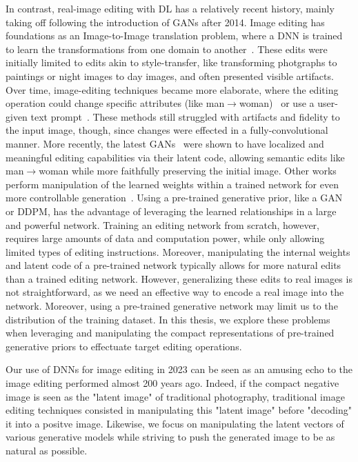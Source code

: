 In contrast, real-image editing with \ac{DL} has a relatively recent history, mainly taking off following the introduction of \ac{GAN}s after 2014.
Image editing has foundations as an Image-to-Image translation problem, where a \ac{DNN} is trained to learn the transformations from 
one domain to another~\citep{isola2017image}. These edits were initially limited to edits akin to style-transfer, like transforming 
photgraphs to paintings or night images to day images, and often presented visible artifacts.
Over time, image-editing techniques became more elaborate, where the editing operation could change  specific attributes 
(like man$\rightarrow$woman)~\citep{choi2020stargan} or use a user-given text prompt~\citep{li2020manigan}. These methods still struggled with artifacts 
and fidelity to the input image, though, since changes were effected in a fully-convolutional manner. More recently, the latest 
\ac{GAN}s~\citep{karra2019stylegan, karra2020stylegan2} 
were shown to have localized and meaningful editing capabilities via their latent code, allowing semantic edits like man$\rightarrow$woman 
while more faithfully preserving the initial image. Other works perform manipulation of the learned weights within a trained network for 
even more controllable generation~\citep{bau2020rewriting}. Using a pre-trained generative prior, like a \ac{GAN} or \ac{DDPM}, has the advantage 
of leveraging the learned relationships in a large and powerful network. Training an editing network from scratch, however, requires large amounts of data and 
computation power, while only allowing limited types of editing instructions. Moreover, manipulating the internal weights and latent code of a 
pre-trained network typically allows for more natural edits than a trained editing network. However, generalizing these edits to real images is not straightforward, 
as we need an effective way to encode a real image into the network. Moreover, using a pre-trained generative network may limit us to the distribution of the 
training dataset. 
In this thesis, we explore these problems when leveraging
and manipulating the compact representations of pre-trained generative priors to effectuate target editing operations. 

Our use of \ac{DNN}s
for image editing in 2023 can be seen as an amusing echo to the image editing performed almost 200 years ago. Indeed, if the compact negative image 
is seen as the "latent image" of traditional photography, traditional image editing techniques consisted in manipulating this "latent image" before "decoding" 
it into a positve image. Likewise, 
we focus on manipulating the latent vectors of various generative models while striving to push the generated image to be as natural as possible.


